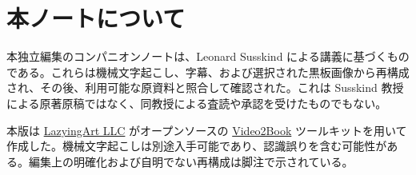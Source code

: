 \documentclass[11pt,oneside]{book}
\begin{document}
\frontmatter
\hypersetup{pageanchor=false}

\hypersetup{pageanchor=true}

\clearpage
\chapter*{本ノートについて}
本独立編集のコンパニオンノートは、Leonard Susskind による講義に基づくものである。これらは機械文字起こし、字幕、および選択された黒板画像から再構成され、その後、利用可能な原資料と照合して確認された。これは Susskind 教授による原著原稿ではなく、同教授による査読や承認を受けたものでもない。

本版は \href{https://lazying.art}{LazyingArt LLC} がオープンソースの \href{https://github.com/lachlanchen/Video2Book}{Video2Book} ツールキットを用いて作成した。機械文字起こしは別途入手可能であり、認識誤りを含む可能性がある。編集上の明確化および自明でない再構成は脚注で示されている。
\clearpage
\tableofcontents
\mainmatter









\end{document}
